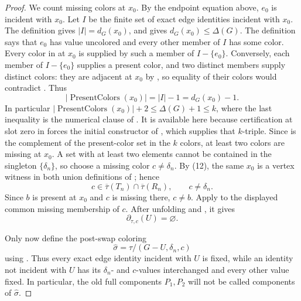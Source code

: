 \begin{proof}
  We count missing colors at $x_0$.  By the endpoint equation above,
  $e_0$ is incident with $x_0$.  Let $I$ be the finite set of exact edge
identities incident with $x_0$.  The definition  gives
$|I|=d_G(x_0)$, and  gives
$d_G(x_0)\leq\Delta(G)$.  The definition
 says that $e_0$ has value uncolored and every
other member of $I$ has some color.  Every color in
 at $x_0$ is supplied by such a member of
$I-\{e_0\}$.  Conversely, each member of $I-\{e_0\}$ supplies a present
color, and two distinct members supply distinct colors: they are adjacent
at $x_0$ by , so equality of their colors would
contradict .  Thus
\[
 |\operatorname{PresentColors}(x_0)|=|I|-1=d_G(x_0)-1.
\]
In particular
$|\operatorname{PresentColors}(x_0)|+2\leq\Delta(G)+1\leq k$, where the
last inequality is the numerical clause of .  It is
available here because certification at slot zero in
 forces the initial constructor of
, which supplies that $k$-triple.  Since
 is the complement of the present-color set in the
$k$ colors, at least two colors are missing at $x_0$.  A set with at least
two elements cannot be contained in the singleton $\{\delta_n\}$, so
  choose a missing color $c\ne\delta_n$.  By (12), the same $x_0$ is a
  vertex witness in both union definitions of ;
  hence
  \[
   c\in\overline\tau(T_n)\cap\overline\tau(R_n),
   \qquad c\ne\delta_n.
  \]
  Since $b$ is present at $x_0$ and $c$ is missing there, $c\ne b$.
  Apply  to the displayed common
  missing membership of $c$.  After unfolding
   and , it gives
  \[
                   \partial_{\tau,c}(U)=\varnothing.           \tag{13}
  \]

  Only now define the post-swap coloring
  \[
         \widehat\sigma=\tau/(G-U,\delta_n,c)
  \]
  using .  Thus every exact edge identity
  incident with $U$ is fixed, while an identity not incident with $U$ has
  its $\delta_n$- and $c$-values interchanged and every other value fixed.
  In particular, the old full components $P_1,P_2$ will not be called
  components of $\widehat\sigma$.


\end{proof}

